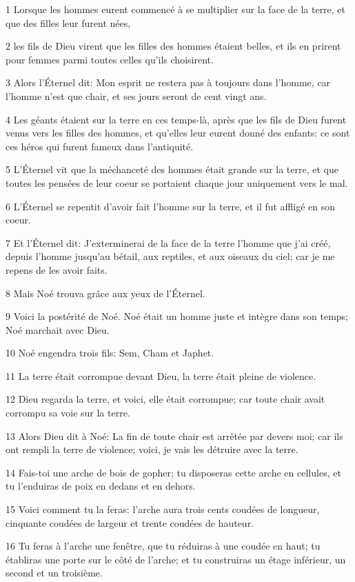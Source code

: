 \par 1 Lorsque les hommes eurent commencé à se multiplier sur la face de la terre, et que des filles leur furent nées,
\par 2 les fils de Dieu virent que les filles des hommes étaient belles, et ils en prirent pour femmes parmi toutes celles qu'ils choisirent.
\par 3 Alors l'Éternel dit: Mon esprit ne restera pas à toujours dans l'homme, car l'homme n'est que chair, et ses jours seront de cent vingt ans.
\par 4 Les géants étaient sur la terre en ces temps-là, après que les fils de Dieu furent venus vers les filles des hommes, et qu'elles leur eurent donné des enfants: ce sont ces héros qui furent fameux dans l'antiquité.
\par 5 L'Éternel vit que la méchanceté des hommes était grande sur la terre, et que toutes les pensées de leur coeur se portaient chaque jour uniquement vers le mal.
\par 6 L'Éternel se repentit d'avoir fait l'homme sur la terre, et il fut affligé en son coeur.
\par 7 Et l'Éternel dit: J'exterminerai de la face de la terre l'homme que j'ai créé, depuis l'homme jusqu'au bétail, aux reptiles, et aux oiseaux du ciel; car je me repens de les avoir faits.
\par 8 Mais Noé trouva grâce aux yeux de l'Éternel.
\par 9 Voici la postérité de Noé. Noé était un homme juste et intègre dans son temps; Noé marchait avec Dieu.
\par 10 Noé engendra trois fils: Sem, Cham et Japhet.
\par 11 La terre était corrompue devant Dieu, la terre était pleine de violence.
\par 12 Dieu regarda la terre, et voici, elle était corrompue; car toute chair avait corrompu sa voie sur la terre.
\par 13 Alors Dieu dit à Noé: La fin de toute chair est arrêtée par devers moi; car ils ont rempli la terre de violence; voici, je vais les détruire avec la terre.
\par 14 Fais-toi une arche de bois de gopher; tu disposeras cette arche en cellules, et tu l'enduiras de poix en dedans et en dehors.
\par 15 Voici comment tu la feras: l'arche aura trois cents coudées de longueur, cinquante coudées de largeur et trente coudées de hauteur.
\par 16 Tu feras à l'arche une fenêtre, que tu réduiras à une coudée en haut; tu établiras une porte sur le côté de l'arche; et tu construiras un étage inférieur, un second et un troisième.
